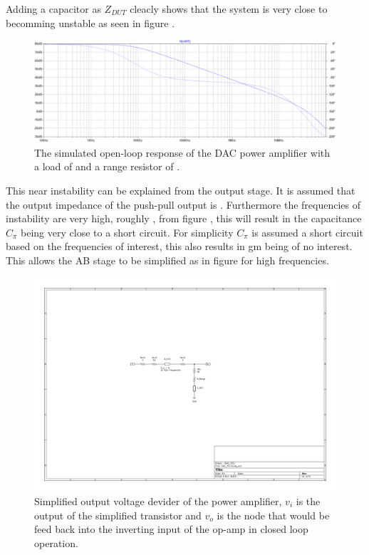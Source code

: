 Adding a  capacitor as $Z_{DUT}$ cleacly shows that the system is very close to becomming unstable as seen in figure .

\begin{figure}[H]
    \centering
    \includegraphics[clip, trim=0 0 0 0, width=1\textwidth]{Sections/7_SystemDesign/Figures/7_1_1_5_DAC_PWR_AMP_150PF.pdf}
    \caption{The simulated open-loop response of the DAC power amplifier with a load  of  and a range resistor of .}
    \label{fig_7_1_1_5_DAC_POWER_AMP_SIM_150PF}
\end{figure}

This near instability can be explained from the output stage. It is assumed that the output impedance of the push-pull output is . Furthermore the frequencies of instability are very high, roughly , from figure , this will result in the capacitance $C_\pi$ being very close to a short circuit. For simplicity $C_\pi$ is assumed a short circuit based on the frequencies of interest, this also results in gm being of no interest. This allows the AB stage to be simplified as in figure  for high frequencies. 

\begin{figure}[H]
    \centering
    \includegraphics[clip, trim=260 240 280 220, width=1\textwidth]{Sections/7_SystemDesign/Figures/7_1_1_5_DAC_FILTER_DAC_PZ.pdf}
    \caption{Simplified output voltage devider of the power amplifier, $v_i$ is the output of the simplified transistor and $v_o$ is the node that would be feed back into the inverting input of the op-amp in closed loop operation.}
    \label{fig_7_1_1_5_DAC_PWR_AMP_PZ}
\end{figure}

